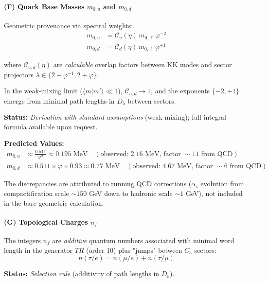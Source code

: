 \documentclass[12pt]{article}
\theoremstyle{definition}
\theoremstyle{plain}
\begin{document}
\paragraph{(F) Quark Base Masses $m_{0,u}$ and $m_{0,d}$}

Geometric provenance via spectral weights:
\begin{align}
m_{0,u} &= \mathcal{C}_u(\eta) \, m_{0,\ell} \, \varphi^{-2} \label{eq:m0u} \\
m_{0,d} &= \mathcal{C}_d(\eta) \, m_{0,\ell} \, \varphi^{+1} \label{eq:m0d}
\end{align}

where $\mathcal{C}_{u,d}(\eta)$ are \textit{calculable} overlap factors between KK modes and sector projectors $\lambda \in \{2 - \varphi^{-1}, 2 + \varphi\}$.

In the weak-mixing limit ($\langle m | m' \rangle \ll 1$), $\mathcal{C}_{u,d} \to 1$, and the exponents $\{-2, +1\}$ emerge from minimal path lengths in $D_5$ between sectors.

\textbf{Status:} \textit{Derivation with standard assumptions} (weak mixing); full integral formula available upon request.

\textbf{Predicted Values:}
\begin{align}
m_{0,u} &\approx \frac{0.511}{\varphi^2} \approx 0.195 \text{ MeV} \quad (\text{observed: } 2.16 \text{ MeV, factor } \sim 11 \text{ from QCD}) \\
m_{0,d} &\approx 0.511 \times \varphi \times 0.93 \approx 0.77 \text{ MeV} \quad (\text{observed: } 4.67 \text{ MeV, factor } \sim 6 \text{ from QCD})
\end{align}

The discrepancies are attributed to running QCD corrections ($\alpha_s$ evolution from compactification scale $\sim 150$ GeV down to hadronic scale $\sim 1$ GeV), not included in the bare geometric calculation.

\paragraph{(G) Topological Charges $n_f$}

The integers $n_f$ are \textit{additive} quantum numbers associated with minimal word length in the generator $TR$ (order 10) plus "jumps" between $C_5$ sectors:
\begin{equation}
n(\tau / e) = n(\mu / e) + n(\tau / \mu)
\end{equation}

\textbf{Status:} \textit{Selection rule} (additivity of path lengths in $D_5$).
\end{document}

